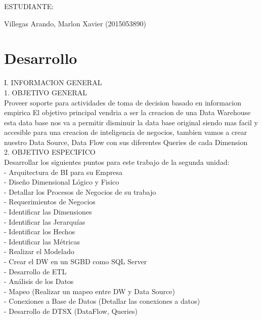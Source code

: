 \documentclass[12pt,letterpaper]{article}
\begin{document}
\begin{titlepage}
\begin{center}
\vspace*{0.2in}
\vspace*{0.1in}
\begin{large}
ESTUDIANTE: \\
\begin{flushleft}

Villegas Arando, Marlon Xavier 		\hfill	(2015053890) \\

\end{flushleft}
\end{large}
\end{center}

\end{titlepage}

 \newpage

\section{Desarrollo} 
I.	INFORMACION GENERAL\\

1.	OBJETIVO GENERAL\\
Proveer soporte para actividades de toma de decision basado en informacion empirica El objetivo principal vendria a ser la creacion de una Data Warehouse esta data base nos va a permitir disminuir la data base original siendo mas facil y accesible para una creacion de inteligencia de negocios, tambien vamos a crear nuestro Data Source, Data Flow con sus diferentes Queries de cada Dimension\\

2.	OBJETIVO ESPECIFICO\\
Desarrollar los siguientes puntos para este trabajo de la segunda unidad:\\

- Arquitectura de BI para su Empresa\\
- Dise\~no Dimensional L\'ogico y Fisico\\
- Detallar los Procesos de Negocios de su trabajo\\
- Requerimientos de Negocios\\
- Identificar las Dimensiones\\
- Identificar las Jerarqu\'ias\\
- Identificar los Hechos\\
- Identificar las M\'etricas\\
- Realizar el Modelado\\
- Crear el DW en un SGBD como SQL Server\\
- Desarrollo de ETL\\
- An\'alisis de los Datos\\
- Mapeo (Realizar un mapeo entre DW y Data Source)\\
- Conexiones a Base de Datos (Detallar las conexiones a datos)\\
- Desarrollo de DTSX (DataFlow, Queries)\\
\end{document}
